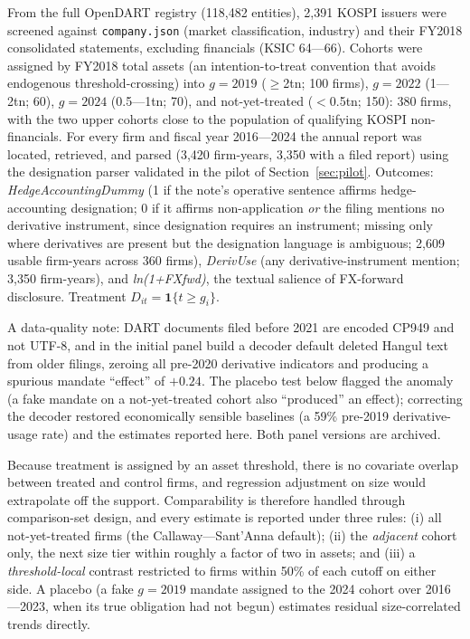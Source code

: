 \documentclass[11pt,a4paper]{article}
\begin{document}
From the full OpenDART registry (118{,}482 entities), 2{,}391 KOSPI issuers were screened against \texttt{company.json} (market classification, industry) and their FY2018 consolidated statements, excluding financials (KSIC 64---66). Cohorts were assigned by FY2018 total assets (an intention-to-treat convention that avoids endogenous threshold-crossing) into $g{=}2019$ ($\ge$2tn; 100 firms), $g{=}2022$ (1---2tn; 60), $g{=}2024$ (0.5---1tn; 70), and not-yet-treated ($<$0.5tn; 150): 380 firms, with the two upper cohorts close to the population of qualifying KOSPI non-financials. For every firm and fiscal year 2016---2024 the annual report was located, retrieved, and parsed (3{,}420 firm-years, 3{,}350 with a filed report) using the designation parser validated in the pilot of Section~\ref{sec:pilot}. Outcomes: \emph{HedgeAccountingDummy} (1 if the note's operative sentence affirms hedge-accounting designation; 0 if it affirms non-application \emph{or} the filing mentions no derivative instrument, since designation requires an instrument; missing only where derivatives are present but the designation language is ambiguous; 2{,}609 usable firm-years across 360 firms), \emph{DerivUse} (any derivative-instrument mention; 3{,}350 firm-years), and \emph{ln(1+FXfwd)}, the textual salience of FX-forward disclosure. Treatment $D_{it}=\mathbf 1\{t\ge g_i\}$.

A data-quality note: DART documents filed before 2021 are encoded CP949 and not UTF-8, and in the initial panel build a decoder default deleted Hangul text from older filings, zeroing all pre-2020 derivative indicators and producing a spurious mandate ``effect'' of $+0.24$. The placebo test below flagged the anomaly (a fake mandate on a not-yet-treated cohort also ``produced'' an effect); correcting the decoder restored economically sensible baselines (a 59\% pre-2019 derivative-usage rate) and the estimates reported here. Both panel versions are archived.

Because treatment is assigned by an asset threshold, there is no covariate overlap between treated and control firms, and regression adjustment on size would extrapolate off the support. Comparability is therefore handled through comparison-set design, and every estimate is reported under three rules: (i) all not-yet-treated firms (the Callaway---Sant'Anna default); (ii) the \emph{adjacent} cohort only, the next size tier within roughly a factor of two in assets; and (iii) a \emph{threshold-local} contrast restricted to firms within 50\% of each cutoff on either side. A placebo (a fake $g{=}2019$ mandate assigned to the 2024 cohort over 2016---2023, when its true obligation had not begun) estimates residual size-correlated trends directly.
\end{document}
